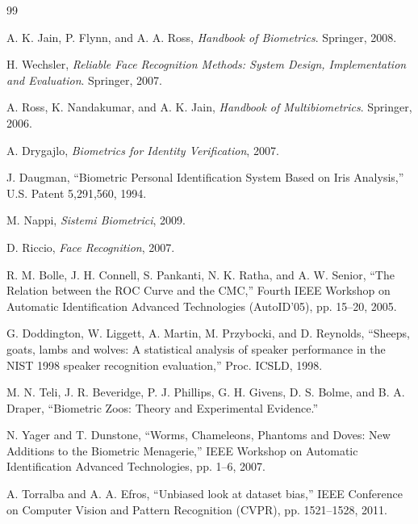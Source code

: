 \documentclass[11pt,a4paper,oneside]{report}
\newcommand{\CurrentSectionMark}{}
\begin{document}
\clearpage
\renewcommand{\bibname}{References}
\gdef\CurrentSectionMark{}

\begingroup
\normalsize
\begin{thebibliography}{99}
\setlength{\itemsep}{0.65em plus 0.1em}
\setlength{\parsep}{0pt}
\raggedright
{}

A. K. Jain, P. Flynn, and A. A. Ross,
\emph{Handbook of Biometrics}. Springer, 2008.

H. Wechsler,
\emph{Reliable Face Recognition Methods: System Design, Implementation and Evaluation}.
Springer, 2007.

A. Ross, K. Nandakumar, and A. K. Jain,
\emph{Handbook of Multibiometrics}. Springer, 2006.

A. Drygajlo, \emph{Biometrics for Identity Verification}, 2007.

J. Daugman, ``Biometric Personal Identification System Based on Iris Analysis,''
U.S. Patent 5,291,560, 1994.

M. Nappi, \emph{Sistemi Biometrici}, 2009.

D. Riccio, \emph{Face Recognition}, 2007.

R. M. Bolle, J. H. Connell, S. Pankanti, N. K. Ratha, and A. W. Senior,
``The Relation between the ROC Curve and the CMC,'' Fourth IEEE Workshop on
Automatic Identification Advanced Technologies (AutoID'05), pp. 15--20, 2005.

G. Doddington, W. Liggett, A. Martin, M. Przybocki, and D. Reynolds,
``Sheeps, goats, lambs and wolves: A statistical analysis of speaker performance
in the NIST 1998 speaker recognition evaluation,'' Proc. ICSLD, 1998.

M. N. Teli, J. R. Beveridge, P. J. Phillips, G. H. Givens, D. S. Bolme,
and B. A. Draper, ``Biometric Zoos: Theory and Experimental Evidence.''

N. Yager and T. Dunstone,
``Worms, Chameleons, Phantoms and Doves: New Additions to the Biometric
Menagerie,'' IEEE Workshop on Automatic Identification Advanced Technologies,
pp. 1--6, 2007.

A. Torralba and A. A. Efros,
``Unbiased look at dataset bias,'' IEEE Conference on Computer Vision and
Pattern Recognition (CVPR), pp. 1521--1528, 2011.


\end{thebibliography}
\end{document}

